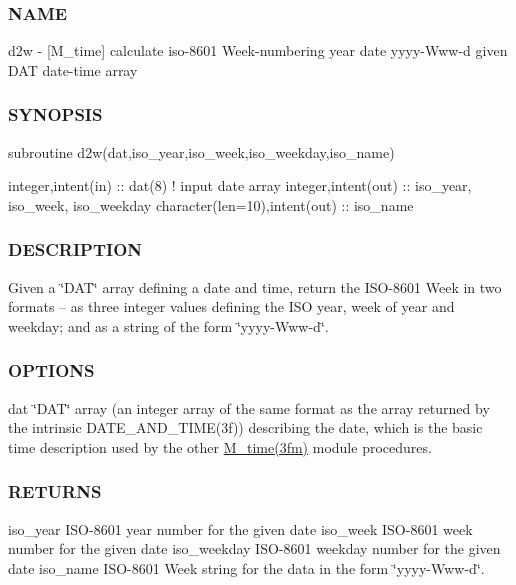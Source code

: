 \subsubsection*{N\+A\+ME}

d2w -\/ \mbox{[}M\+\_\+time\mbox{]} calculate iso-\/8601 Week-\/numbering year date yyyy-\/\+Www-\/d given D\+AT date-\/time array 

\subsubsection*{S\+Y\+N\+O\+P\+S\+IS}

\begin{DoxyVerb}subroutine d2w(dat,iso_year,iso_week,iso_weekday,iso_name)

 integer,intent(in)              :: dat(8)     ! input date array
 integer,intent(out)             :: iso_year, iso_week, iso_weekday
 character(len=10),intent(out)   :: iso_name
\end{DoxyVerb}


\subsubsection*{D\+E\+S\+C\+R\+I\+P\+T\+I\+ON}

Given a \char`\"{}\+D\+A\+T\char`\"{} array defining a date and time, return the I\+S\+O-\/8601 Week in two formats -- as three integer values defining the I\+SO year, week of year and weekday; and as a string of the form \char`\"{}yyyy-\/\+Www-\/d\char`\"{}.

\subsubsection*{O\+P\+T\+I\+O\+NS}

dat \char`\"{}\+D\+A\+T\char`\"{} array (an integer array of the same format as the array returned by the intrinsic D\+A\+T\+E\+\_\+\+A\+N\+D\+\_\+\+T\+I\+M\+E(3f)) describing the date, which is the basic time description used by the other \hyperlink{M__time_83_8txt_a9591ef7ca68b7656bfd5560ed8d81293}{M\+\_\+time(3fm)} module procedures. \subsubsection*{R\+E\+T\+U\+R\+NS}

iso\+\_\+year I\+S\+O-\/8601 year number for the given date iso\+\_\+week I\+S\+O-\/8601 week number for the given date iso\+\_\+weekday I\+S\+O-\/8601 weekday number for the given date iso\+\_\+name I\+S\+O-\/8601 Week string for the data in the form \char`\"{}yyyy-\/\+Www-\/d\char`\"{}.

